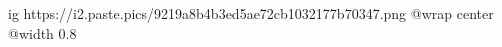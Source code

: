  
 
 
 
 

\ifcmt
  ig https://i2.paste.pics/9219a8b4b3ed5ae72cb1032177b70347.png
  @wrap center
  @width 0.8
\fi
